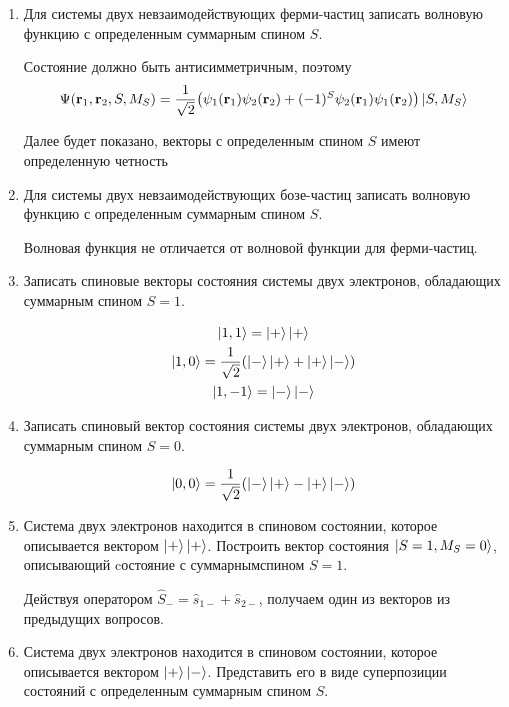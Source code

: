\documentclass{article}
\begin{document}
\begin{enumerate}
	\item {Для системы двух невзаимодействующих ферми-частиц записать волновую функцию с определенным суммарным спином $S$.}
	
	Состояние должно быть антисимметричным, поэтому
	\begin{equation}
		\Psi(\textbf{r}_1, \textbf{r}_2, S, M_S) = \frac{1}{\sqrt{2}}\big( \psi_1(\textbf{r}_1) \psi_2(\textbf{r}_2) + (-1)^S \psi_2(\textbf{r}_1) \psi_1(\textbf{r}_2) \big) \ket{S, M_S}
	\end{equation}
	
	Далее будет показано, векторы с определенным спином $S$ имеют определенную четность
	
	\item {Для системы двух невзаимодействующих бозе-частиц записать волновую функцию с определенным суммарным спином $S$.}
	
	Волновая функция не отличается от волновой функции для ферми-частиц.
	
	\item {Записать спиновые векторы состояния системы двух электронов, обладающих суммарным спином $S = 1$.}
	
	\begin{gather}
		\ket{1,1} = \ket{+}\ket{+} \\
		\ket{1,0} = \frac{1}{\sqrt{2}}( \ket{-}\ket{+} + \ket{+}\ket{-}) \\
		\ket{1,-1} = \ket{-}\ket{-}
	\end{gather}
	
	\item {Записать спиновый вектор состояния системы двух электронов, обладающих суммарным спином $S = 0$.}
	
	\begin{equation}
		\ket{0,0} = \frac{1}{\sqrt{2}}( \ket{-}\ket{+} - \ket{+}\ket{-}) 
	\end{equation}
	
	\item {Система двух электронов находится в спиновом состоянии, которое описывается вектором $\ket{+}\ket{+}$. Построить вектор состояния $\ket{S = 1, M_S = 0}$, описывающий cостояние с суммарнымспином $S = 1$.}
	
	Действуя оператором $\hat{S}_- = \hat{s}_{1-} + \hat{s}_{2-}$, получаем один из векторов из предыдущих вопросов.
		
	\item {Система двух электронов находится в спиновом состоянии, которое описывается вектором $\ket{+} \ket{-}$. Представить его в виде суперпозиции состояний с определенным суммарным спином $S$.}
	

\end{enumerate}
\end{document}
